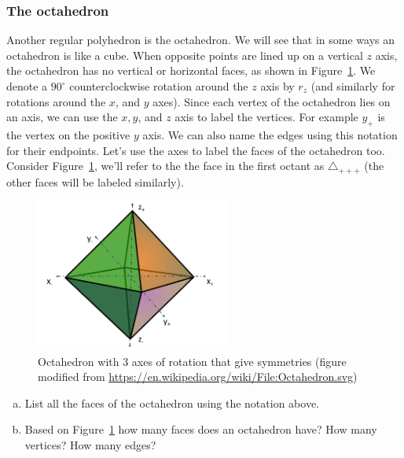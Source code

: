 \subsubsection*{The octahedron}
Another regular polyhedron is the octahedron.  We will see that in some ways an octahedron is like a cube. 
When opposite points are lined up  on a vertical $z$ axis, the octahedron has no vertical or horizontal faces, as shown in Figure~\ref{fig:OctaRot}.  We denote a  $90^{\circ}$ counterclockwise rotation around the $z$ axis by $r_z$ (and similarly for rotations around the $x$, and $y$ axes).
Since each vertex of the octahedron lies on an axis, we can use the $x,y$, and $z$ axis to label the vertices.  For example $y_+$ is the vertex on the positive $y$ axis.   We can also name the edges using this notation for their endpoints.   Let's use the axes to label the faces of the octahedron too.  Consider Figure~\ref{fig:OctaRot}, we'll refer to the the face in the first octant as $\triangle_{ +++}$ (the other faces will be labeled similarly).

\begin{figure}[ht]
\begin{center}
\includegraphics[width=2.5in]{images/AxesOfOctahedron.png}
\caption{\label{fig:OctaRot}Octahedron with 3 axes of rotation that give symmetries (figure modified from \url{https://en.wikipedia.org/wiki/File:Octahedron.svg})
}
\end{center}
\end{figure}


\begin{exercise}\label{exercise:actions:Octa1}
\begin{enumerate}[(a)]
\item List all the faces of the octahedron using the notation above.
\item Based on Figure~\ref{fig:OctaRot}  how many faces does an octahedron have? How many vertices?  How many edges?
\end{enumerate}
\end{exercise}


